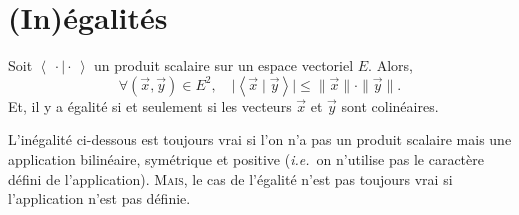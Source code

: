 \section{(In)égalités}

\begin{thm}
	Soit $\left<\:\cdot\mid\cdot\:\right>$\/ un produit scalaire sur un espace vectoriel $E$. Alors, \[
		\forall (\vec{x},\vec{y}) \in E^2,\quad\big|\left<\vec{x} \mid \vec{y} \right>\big| \le \|\vec{x}\|\cdot \|\vec{y}\|
	.\]
	Et, il y a égalité si et seulement si les vecteurs $\vec{x}$\/ et $\vec{y}$\/ sont colinéaires.
\end{thm}

L'inégalité ci-dessous est toujours vrai si l'on n'a pas un produit scalaire mais une application bilinéaire, symétrique et positive (\textit{i.e.}\ on n'utilise pas le caractère défini de l'application). \textsc{Mais}, le cas de l'égalité n'est pas toujours vrai si l'application n'est pas définie.


